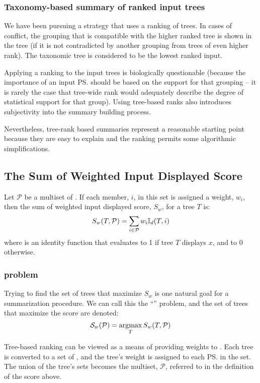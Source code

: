 \documentclass[11pt]{article}
\begin{document}
\subsubsection{Taxonomy-based summary of ranked input trees}
We have been pursuing a strategy that uses a ranking of trees.
In cases of conflict, the grouping that is compatible with the 
    higher ranked tree is shown in the tree (if it is not contradicted by 
    another grouping from trees of even higher rank).
 The taxonomic tree is considered to be the lowest ranked input.

Applying a ranking to the input trees is biologically questionable (because
    the importance of an input \ps should be based on the support for that
    grouping -- it is rarely the case that tree-wide rank would adequately
    describe the degree of statistical support for that group).
Using tree-based ranks also introduces subjectivity into the summary building process.

Nevertheless, tree-rank based summaries represent a reasonable starting point
    because they are easy to explain and the ranking permits some algorithmic
    simplifications.

\subsection{The Sum of Weighted Input \PSs Displayed Score}
Let $\mathcal{P}$ be a multiset of \pss.
If each member, $i$, in this set is assigned a weight, $w_i$, then the 
sum of weighted input \pss displayed score, $S_w$, for a tree $T$ is:
\begin{equation}
    S_w(T, \mathcal{P}) = \sum_{i\in \mathcal{P}} w_i \mathbb{I}_d(T, i)
\end{equation}
where {} is an identity function that evaluates to 1 if tree $T$
        displays $x$, and to 0 otherwise.

\subsubsection{\MSWIPSD problem}
Trying to find the set of trees that maximize $S_w$ is one natural
    goal for a summarization procedure.
We can call this the ``\MSWIPSD''
problem,
    and the set of trees that maximize the score are denoted:
\begin{equation}
    \mathcal{S}_{w}(\mathcal{P}) = \operatorname*{\arg\!\max}_T S_w(T,\mathcal{P}) 
\end{equation}

Tree-based ranking can be viewed as a means of providing weights to \pss.
Each tree is converted to a set of \pss, and the tree's weight is 
    assigned to each \ps in the set.
The union of the tree's sets becomes the multiset, $\mathcal{P}$, referred to
    in the definition of the score above.
\end{document}
